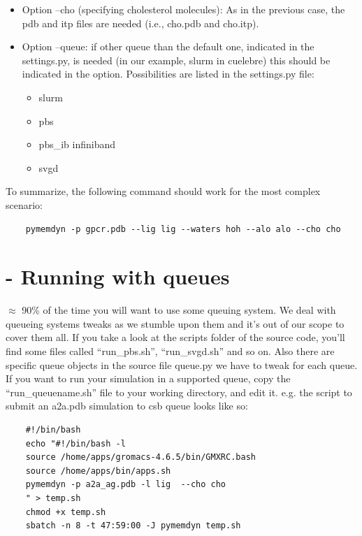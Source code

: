 \documentclass[10pt, oneside, pdftex]{article}
\begin{document}
\begin{itemize}
\begin{itemize}
{  structural waters: ion-local.pdb  and ion-local.itp.}  
\item{Option --cho
  (specifying cholesterol molecules): As in the previous case, the pdb
  and  itp files  are needed  (i.e., cho.pdb  and cho.itp).}
\item{Option --queue: if  other queue than the  default one, indicated
  in the  settings.py, is needed  (in our example, slurm  in cuelebre)
  this should be indicated in  the option. Possibilities are listed in
  the settings.py file:}
\begin{itemize}
\item{slurm}
\item{pbs}
\item{pbs\_ib   infiniband}
\item{svgd}
\end{itemize}
\end{itemize}
\end{itemize}

\noindent To summarize, the following command should work for the most 
complex scenario:
\begin{Verbatim}
    pymemdyn -p gpcr.pdb --lig lig --waters hoh --alo alo --cho cho
\end{Verbatim}

\section*{ - Running with queues}
$\approx$  90\%  of  the  time  you will  want  to  use  some  queuing
system. We deal  with queueing systems tweaks as we  stumble upon them
and it's out  of our scope to cover  them all.  If you take  a look at
the scripts folder  of the source code, you'll find  some files called
``run\_pbs.sh'', ``run\_svgd.sh''  and so on. Also  there are specific
queue objects  in the source file  queue.py we have to  tweak for each
queue.  If you want to run  your simulation in a supported queue, copy
the  ``run\_queuename.sh'' file  to your  working directory,  and edit
it. e.g.   the script  to submit  an a2a.pdb  simulation to  csb queue
looks like so:

\begin{Verbatim}
    #!/bin/bash
    echo "#!/bin/bash -l
    source /home/apps/gromacs-4.6.5/bin/GMXRC.bash
    source /home/apps/bin/apps.sh
    pymemdyn -p a2a_ag.pdb -l lig  --cho cho
    " > temp.sh
    chmod +x temp.sh
    sbatch -n 8 -t 47:59:00 -J pymemdyn temp.sh
\end{Verbatim}
\end{document}
